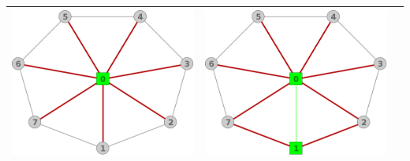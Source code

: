 \begin{center}
\begin{tabular}{ |c||c||c| }
			\includegraphics[scale = 0.25]{img/ej3/constructiva_golosa/Wheel_st1.png} &
			\includegraphics[scale = 0.25]{img/ej3/constructiva_golosa/Wheel_st2.png} \\
			\hline
		\end{tabular}
	\end{center}

